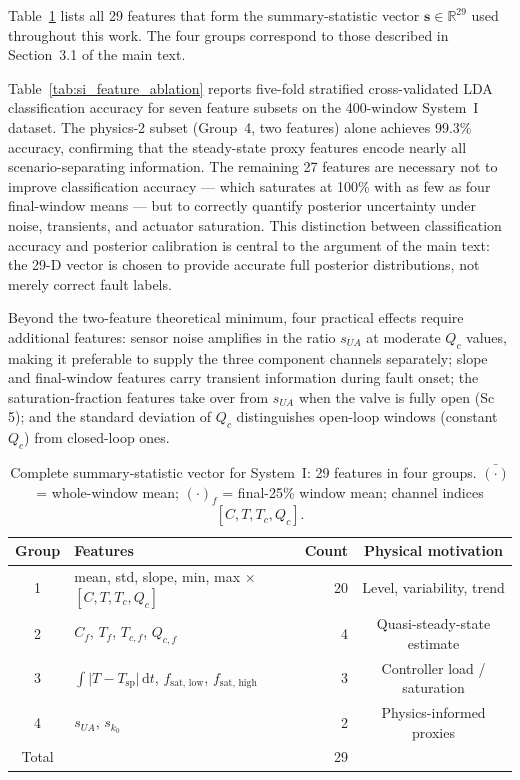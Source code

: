 \documentclass[aps,pre,twocolumn,superscriptaddress]{revtex4-2}
\begin{document}
Table~\ref{tab:si_summary_stats} lists all 29 features that form the summary-statistic
vector $\mathbf{s}\in\mathbb{R}^{29}$ used throughout this work.  The four groups
correspond to those described in Section~3.1 of the main text.

Table~\ref{tab:si_feature_ablation} reports five-fold stratified cross-validated
LDA classification accuracy for seven feature subsets on the 400-window
System~I dataset.  The physics-2 subset (Group~4, two features) alone achieves
99.3\% accuracy, confirming that the steady-state proxy features encode nearly
all scenario-separating information.  The remaining 27 features are necessary
not to improve classification accuracy --- which saturates at 100\% with as few
as four final-window means --- but to correctly quantify posterior uncertainty
under noise, transients, and actuator saturation.  This distinction between
classification accuracy and posterior calibration is central to the argument of
the main text: the 29-D vector is chosen to provide accurate full posterior
distributions, not merely correct fault labels.

Beyond the two-feature theoretical minimum, four practical effects require
additional features: sensor noise amplifies in the ratio $s_{U\!A}$ at moderate
$Q_c$ values, making it preferable to supply the three component channels
separately; slope and final-window features carry transient information during
fault onset; the saturation-fraction features take over from $s_{U\!A}$ when
the valve is fully open (Sc\,5); and the standard deviation of $Q_c$ distinguishes
open-loop windows (constant $Q_c$) from closed-loop ones.

\begin{table}[htbp]
\centering
\caption{Complete summary-statistic vector for System~I: 29 features in four
  groups.  $\bar{(\cdot)}$ = whole-window mean; $(\cdot)_f$ = final-25\%
  window mean; channel indices $[C,T,T_c,Q_c]$.}
\label{tab:si_summary_stats}
\small
\begin{tabular}{clrc}
\toprule
Group & Features & Count & Physical motivation \\
\midrule
1 & mean, std, slope, min, max $\times$ $[C,T,T_c,Q_c]$ & 20 & Level, variability, trend \\
2 & $C_f$, $T_f$, $T_{c,f}$, $Q_{c,f}$                 & 4  & Quasi-steady-state estimate \\
3 & $\int\lvert T-T_\mathrm{sp}\rvert\,\mathrm{d}t$,
    $f_\mathrm{sat,\,low}$, $f_\mathrm{sat,\,high}$    & 3  & Controller load / saturation \\
4 & $s_{U\!A}$,\; $s_{k_0}$                             & 2  & Physics-informed proxies \\
\midrule
Total &                                                   & 29 & \\
\bottomrule
\end{tabular}
\end{table}
\end{document}
